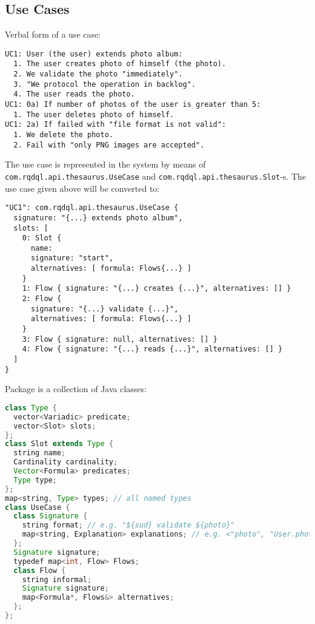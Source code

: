 \documentclass{article}
\begin{document}
    \subsection{Use Cases}

        Verbal form of a use case:

        \begin{verbatim}
UC1: User (the user) extends photo album:
  1. The user creates photo of himself (the photo).
  2. We validate the photo "immediately".
  3. "We protocol the operation in backlog".
  4. The user reads the photo.
UC1: 0a) If number of photos of the user is greater than 5:
  1. The user deletes photo of himself.
UC1: 2a) If failed with "file format is not valid":
  1. We delete the photo.
  2. Fail with "only PNG images are accepted".\end{verbatim}

        The use case is represented in the system by means of
        \texttt{com.rqdql.api.thesaurus.UseCase} and \texttt{com.rqdql.api.thesaurus.Slot}-s. The
        use case given above will be converted to:

        \begin{verbatim}
"UC1": com.rqdql.api.thesaurus.UseCase {
  signature: "{...} extends photo album",
  slots: [
    0: Slot {
      name:
      signature: "start",
      alternatives: [ formula: Flows{...} ]
    }
    1: Flow { signature: "{...} creates {...}", alternatives: [] }
    2: Flow {
      signature: "{...} validate {...}",
      alternatives: [ formula: Flows{...} ]
    }
    3: Flow { signature: null, alternatives: [] }
    4: Flow { signature: "{...} reads {...}", alternatives: [] }
  ]
}\end{verbatim}

        Package  is a collection of Java classes:

    \begin{lstlisting}[language=Java]
class Type {
  vector<Variadic> predicate;
  vector<Slot> slots;
};
class Slot extends Type {
  string name;
  Cardinality cardinality;
  Vector<Formula> predicates;
  Type type;
};
map<string, Type> types; // all named types
class UseCase {
  class Signature {
    string format; // e.g. "${sud} validate ${photo}"
    map<string, Explanation> explanations; // e.g. <"photo", "User.photos">
  };
  Signature signature;
  typedef map<int, Flow> Flows;
  class Flow {
    string informal;
    Signature signature;
    map<Formula*, Flows&> alternatives;
  };
};
\end{lstlisting}
\end{document}
